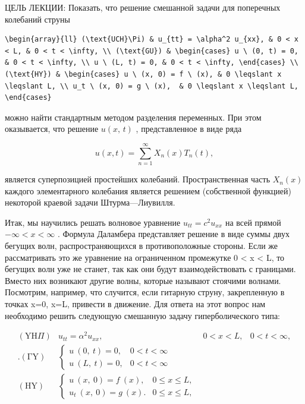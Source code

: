 \documentclass[
  ukrainian,
]{article}
\begin{document}
ЦЕЛЬ ЛЕКЦИИ: Показать, что решение смешанной задачи для поперечных
колебаний струны

\begin{verbatim}
\begin{array}{ll} (\text{UCH}\Pi) & u_{tt} = \alpha^2 u_{xx}, & 0 < x < L, & 0 < t < \infty, \\ (\text{GU}) & \begin{cases} u \ (0, t) = 0, & 0 < t < \infty, \\ u \ (L, t) = 0, & 0 < t < \infty, \end{cases} \\ (\text{HY}) & \begin{cases} u \ (x, 0) = f \ (x), & 0 \leqslant x \leqslant L, \\ u_t \ (x, 0) = g \ (x),  & 0 \leqslant x \leqslant L, \end{cases}
\end{verbatim}

можно найти стандартным методом разделения переменных. При этом
оказывается, что решение \(u\left(x,\,t\right)\) , представленное в виде
ряда

\[
u(x, t) = \sum_{n=1}^{\infty} X_n(x) T_n(t),
\]

является суперпозицией простейших колебаний. Пространственная часть
\(X_n(x)\) каждого элементарного колебания является решением
(собственной функцией) некоторой краевой задачи Штурма---Лиувилля.

Итак, мы научились решать волновое уравнение \(u_{tt}=c^2u_{xx}\) на
всей прямой \(-\infty < x < \infty\) . Формула Даламбера представляет
решение в виде суммы двух бегущих волн, распространяющихся в
противоположные стороны. Если же рассматривать это же уравнение на
ограниченном промежутке 0 \textless{} x \textless{} L, то бегущих волн
уже не станет, так как они будут взаимодействовать с границами. Вместо
них возникают другие волны, которые называют стоячими волнами.
Посмотрим, например, что случится, если гитарную струну, закрепленную в
точках x=0, x=L, привести в движение. Для ответа на этот вопрос нам
необходимо решить следующую смешанную задачу гиперболического типа:

\[
\begin{array}{ll} (\mathrm{Y}\mathrm{H}\Pi) & u_{tt} = \alpha^2 u_{xx}, & 0 < x < L, & 0 < t < \infty, \\ . (\mathrm{\Gamma}\mathrm{Y}) & \begin{cases} u \ (0, \ t) = 0, & 0 < t < \infty \\ u \ (L, \ t) = 0, & 0 < t < \infty \end{cases} \\ (\mathrm{H}\mathrm{Y}) & \begin{cases} u \ (x, \ 0) = f \ (x), & 0 \leqslant x \leqslant L, \\ u_t \ (x, \ 0) = g \ (x). & 0 \leqslant x \leqslant L, \end{cases} \end{array}
\]
\end{document}
